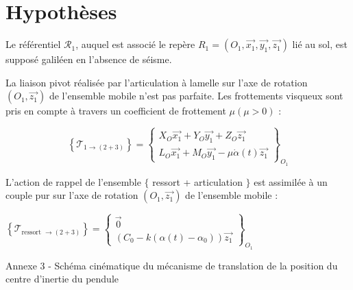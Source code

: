 \documentclass[10pt]{article}
\begin{document}
\section*{Hypothèses}
Le référentiel $\mathcal{R}_{1}$, auquel est associé le repère $R_{1}=\left(O_{1}, \overrightarrow{x_{1}}, \overrightarrow{y_{1}}, \overrightarrow{z_{1}}\right)$ lié au sol, est supposé galiléen en l'absence de séisme.

La liaison pivot réalisée par l'articulation à lamelle sur l'axe de rotation $\left(O_{1}, \overrightarrow{z_{1}}\right)$ de l'ensemble mobile n'est pas parfaite. Les frottements visqueux sont pris en compte à travers un coefficient de frottement $\mu(\mu>0)$ :

$$
\left\{\mathcal{T}_{1 \rightarrow(2+3)}\right\}=\left\{\begin{array}{c}
X_{O} \overrightarrow{x_{1}}+Y_{O} \overrightarrow{y_{1}}+Z_{O} \overrightarrow{z_{1}} \\
L_{O} \overrightarrow{x_{1}}+M_{O} \overrightarrow{y_{1}}-\mu \dot{\alpha}(t) \overrightarrow{z_{1}}
\end{array}\right\}_{O_{1}}
$$

L'action de rappel de l'ensemble $\{$ ressort + articulation $\}$ est assimilée à un couple pur sur l'axe de rotation $\left(O_{1}, \overrightarrow{z_{1}}\right)$ de l'ensemble mobile :

$\left\{\mathcal{T}_{\text {ressort } \rightarrow(2+3)}\right\}=\left\{\begin{array}{c}\overrightarrow{0} \\ \left(C_{0}-k\left(\alpha(t)-\alpha_{0}\right)\right) \overrightarrow{z_{1}}\end{array}\right\}_{O_{1}}$

Annexe 3 - Schéma cinématique du mécanisme de translation de la position du centre d'inertie du pendule
\end{document}
